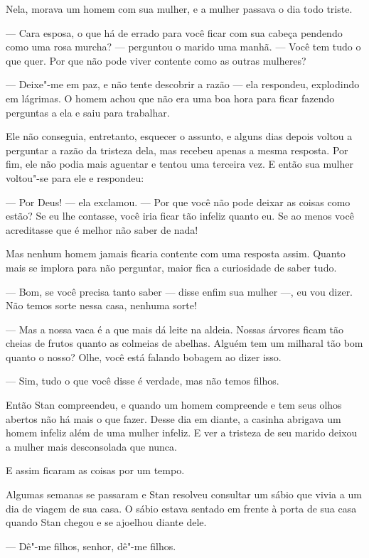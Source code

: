 Nela, morava um homem com sua mulher, e a mulher passava o dia todo
triste.

--- Cara esposa, o que há de errado para você ficar com sua cabeça
pendendo como uma rosa murcha? --- perguntou o marido uma manhã. --- Você
tem tudo o que quer. Por que não pode viver contente como as outras
mulheres?

--- Deixe"-me em paz, e não tente descobrir a razão --- ela respondeu,
explodindo em lágrimas. O homem achou que não era uma boa hora para
ficar fazendo perguntas a ela e saiu para trabalhar.

Ele não conseguia, entretanto, esquecer o assunto, e alguns dias
depois voltou a perguntar a razão da tristeza dela, mas recebeu
apenas a mesma resposta. Por fim, ele não podia mais aguentar e
tentou uma terceira vez. E então sua mulher voltou"-se para ele e
respondeu:

--- Por Deus! --- ela exclamou. --- Por que você não pode deixar as coisas
como estão? Se eu lhe contasse, você iria ficar tão infeliz quanto
eu. Se ao menos você acreditasse que é melhor não saber de nada!

Mas nenhum homem jamais ficaria contente com uma resposta assim.
Quanto mais se implora para não perguntar, maior fica a curiosidade
de saber tudo.

--- Bom, se você precisa tanto saber --- disse enfim sua mulher ---, eu vou
dizer. Não temos sorte nessa casa, nenhuma sorte!

--- Mas a nossa vaca é a que mais dá leite na aldeia. Nossas
árvores ficam tão cheias de frutos quanto as colmeias de abelhas. Alguém
tem um milharal tão bom quanto o nosso? Olhe, você está falando
bobagem ao dizer isso.

--- Sim, tudo o que você disse é verdade, mas não temos filhos.

Então Stan compreendeu, e quando um homem compreende e tem seus olhos
abertos não há mais o que fazer. Desse dia em diante, a casinha
abrigava um homem infeliz além de uma mulher infeliz. E ver a
tristeza de seu marido deixou a mulher mais desconsolada que nunca.

E assim ficaram as coisas por um tempo.

Algumas semanas se passaram e Stan resolveu consultar um sábio que
vivia a um dia de viagem de sua casa. O sábio estava sentado em
frente à porta de sua casa quando Stan chegou e se ajoelhou
diante dele.

--- Dê"-me filhos, senhor, dê"-me filhos.

